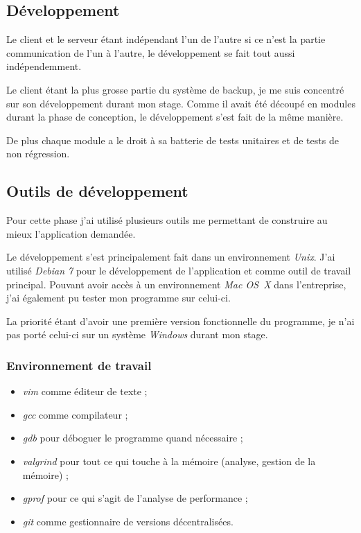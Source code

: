 \documentclass[a4paper,10pt, twoside]{report}
\begin{document}
\begin{spacing}{1.2}
\section{Développement}

Le client et le serveur étant indépendant l'un de l'autre si ce n'est la partie
communication de l'un à l'autre, le développement se fait tout aussi
indépendemment.

Le client étant la plus grosse partie du système de backup, je me suis concentré
sur son développement durant mon stage. Comme il avait été découpé en modules
durant la phase de conception, le développement s'est fait de la même manière.

De plus chaque module a le droit à sa batterie de tests unitaires et de tests de
non régression.

\subsection{Outils de développement}

Pour cette phase j'ai utilisé plusieurs outils me permettant de construire au
mieux l'application demandée. 

Le développement s'est principalement fait dans un environnement \textit{Unix}.
J'ai utilisé \textit{Debian 7} pour le développement de l'application et comme
outil de travail principal. Pouvant avoir accès à un environnement
\textit{Mac OS~X} dans l'entreprise, j'ai également pu tester mon programme sur
celui-ci.

La priorité étant d'avoir une première version fonctionnelle du programme, je
n'ai pas porté celui-ci sur un système \textit{Windows} durant mon stage.

\subsubsection{Environnement de travail}
\begin{itemize}
 \item \textit{vim} comme éditeur de texte ;
 \item \textit{gcc} comme compilateur ;
 \item \textit{gdb} pour déboguer le programme quand nécessaire ;
 \item \textit{valgrind} pour tout ce qui touche à la mémoire (analyse, gestion
 de la mémoire) ;
 \item \textit{gprof} pour ce qui s'agit de l'analyse de performance ;
 \item \textit{git} comme gestionnaire de versions décentralisées.
\end{itemize}


\end{spacing}
\end{document}

